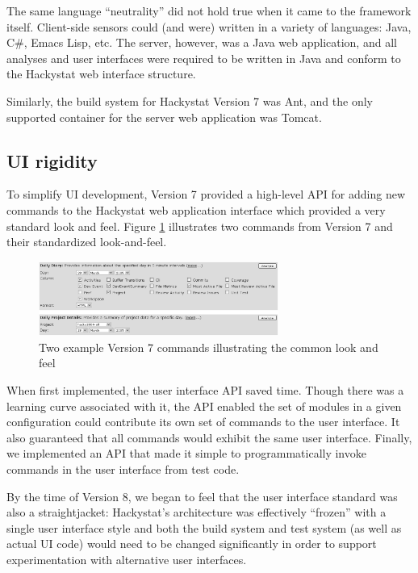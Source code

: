 \documentclass[conference,compsoc]{IEEEtran}
\begin{document}
The same language ``neutrality'' did not hold true when it came to the
framework itself.  Client-side sensors could (and were) written in a
variety of languages: Java, C\#, Emacs Lisp, etc. The server, however, was
a Java web application, and all analyses and user interfaces were required
to be written in Java and conform to the Hackystat web interface structure.

Similarly, the build system for Hackystat Version 7 was Ant, and the only
supported container for the server web application was Tomcat.

\subsection{UI rigidity}

To simplify UI development, Version 7 provided a high-level API for adding
new commands to the Hackystat web application interface which provided a
very standard look and feel.  Figure \ref{fig:commands} illustrates two
commands from Version 7 and their standardized look-and-feel.

\begin{figure}[ht]
  \center
  \includegraphics[width=0.7\textwidth]{v7commands.eps}
  \caption{Two example Version 7 commands illustrating the common look and feel}
  \label{fig:commands}
\end{figure} 

When first implemented, the user interface API saved time.  Though there
was a learning curve associated with it, the API enabled the set of modules
in a given configuration could contribute its own set of commands to the
user interface.  It also guaranteed that all commands would exhibit the
same user interface. Finally, we implemented an API that made it simple to
programmatically invoke commands in the user interface from test code.

By the time of Version 8, we began to feel that the user interface standard
was also a straightjacket: Hackystat's architecture was effectively
``frozen'' with a single user interface style and both the build system and
test system (as well as actual UI code) would need to be changed
significantly in order to support experimentation with alternative user
interfaces.
\end{document}
